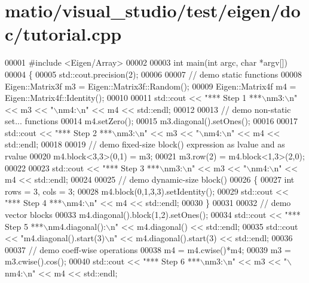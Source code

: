 \hypertarget{matio_2visual__studio_2test_2eigen_2doc_2tutorial_8cpp_source}{}\section{matio/visual\+\_\+studio/test/eigen/doc/tutorial.cpp}
\label{matio_2visual__studio_2test_2eigen_2doc_2tutorial_8cpp_source}

\begin{DoxyCode}
00001 \textcolor{preprocessor}{#include <Eigen/Array>}
00002 
00003 \textcolor{keywordtype}{int} main(\textcolor{keywordtype}{int} argc, \textcolor{keywordtype}{char} *argv[])
00004 \{
00005   std::cout.precision(2);
00006 
00007   \textcolor{comment}{// demo static functions}
00008   Eigen::Matrix3f m3 = Eigen::Matrix3f::Random();
00009   Eigen::Matrix4f m4 = Eigen::Matrix4f::Identity();
00010 
00011   std::cout << \textcolor{stringliteral}{"*** Step 1 ***\(\backslash\)nm3:\(\backslash\)n"} << m3 << \textcolor{stringliteral}{"\(\backslash\)nm4:\(\backslash\)n"} << m4 << std::endl;
00012 
00013   \textcolor{comment}{// demo non-static set... functions}
00014   m4.setZero();
00015   m3.diagonal().setOnes();
00016   
00017   std::cout << \textcolor{stringliteral}{"*** Step 2 ***\(\backslash\)nm3:\(\backslash\)n"} << m3 << \textcolor{stringliteral}{"\(\backslash\)nm4:\(\backslash\)n"} << m4 << std::endl;
00018 
00019   \textcolor{comment}{// demo fixed-size block() expression as lvalue and as rvalue}
00020   m4.block<3,3>(0,1) = m3;
00021   m3.row(2) = m4.block<1,3>(2,0);
00022 
00023   std::cout << \textcolor{stringliteral}{"*** Step 3 ***\(\backslash\)nm3:\(\backslash\)n"} << m3 << \textcolor{stringliteral}{"\(\backslash\)nm4:\(\backslash\)n"} << m4 << std::endl;
00024 
00025   \textcolor{comment}{// demo dynamic-size block()}
00026   \{
00027     \textcolor{keywordtype}{int} rows = 3, cols = 3;
00028     m4.block(0,1,3,3).setIdentity();
00029     std::cout << \textcolor{stringliteral}{"*** Step 4 ***\(\backslash\)nm4:\(\backslash\)n"} << m4 << std::endl;
00030   \}
00031 
00032   \textcolor{comment}{// demo vector blocks}
00033   m4.diagonal().block(1,2).setOnes();
00034   std::cout << \textcolor{stringliteral}{"*** Step 5 ***\(\backslash\)nm4.diagonal():\(\backslash\)n"} << m4.diagonal() << std::endl;
00035   std::cout << \textcolor{stringliteral}{"m4.diagonal().start(3)\(\backslash\)n"} << m4.diagonal().start(3) << std::endl;
00036 
00037   \textcolor{comment}{// demo coeff-wise operations}
00038   m4 = m4.cwise()*m4;
00039   m3 = m3.cwise().cos();
00040   std::cout << \textcolor{stringliteral}{"*** Step 6 ***\(\backslash\)nm3:\(\backslash\)n"} << m3 << \textcolor{stringliteral}{"\(\backslash\)nm4:\(\backslash\)n"} << m4 << std::endl;

\end{DoxyCode}
